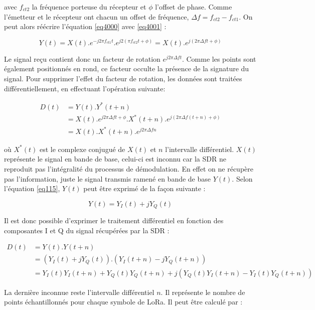 avec $f_{ct2}$ la fréquence porteuse du récepteur et $\phi$ l'offset de phase. Comme l'émetteur et le récepteur ont chacun un offset de fréquence, $\Delta f = f_{ct2} - f_{ct1}$. On peut alors réécrire l'équation \ref{eq4000} avec \ref{eq4001} :

\begin{equation}\label{eq4002}
	Y(t) = X(t) . e^{-j2\pi f_{ct1} t} . e^{j2(\pi f_{ct2} t+ \phi)} = X(t) . e^{j(2\pi \Delta f t + \phi)}
\end{equation} 

Le signal reçu contient donc un facteur de rotation $e^{j2\pi \Delta f t}$. Comme les points sont également positionnés en rond, ce facteur occulte la présence de la signature du signal.
Pour supprimer l'effet du facteur de rotation, les données sont traitées différentiellement, en effectuant l'opération suivante:

\begin{align}\label{eq4003}
	D(t) &= Y(t) . Y^{*}(t+n) \\
		 &= X(t) . e^{j2\pi \Delta f t+ \phi} .X^{*}(t+n) . e^{j(2\pi \Delta f (t + n) + \phi)} \\
 		 &= X(t) . X^{*}(t+n) . e^{j2\pi \Delta f n}
\end{align}

où $X^{*}(t)$ est le complexe conjugué de $X(t)$ et $n$ l'intervalle différentiel. $X(t)$ représente le signal en bande de base, celui-ci est inconnu car la SDR ne reproduit pas l'intégralité du processus de démodulation. En effet on ne récupère pas l'information, juste le signal transmis ramené en bande de base $Y(t)$. Selon l'équation \ref{eq115}, $Y(t)$ peut être exprimé de la façon suivante : 

\begin{equation}\label{eq4004}
	Y(t) = Y_I(t) + jY_Q(t)
\end{equation} 

Il est donc possible d'exprimer le traitement différentiel en fonction des composantes I et Q du signal récupérées par la SDR :

\begin{align}\label{eq4005}
	D(t) &= Y(t) . Y(t+n) \\
		 &= (Y_I(t) + jY_Q(t)) . (Y_I(t+n) - jY_Q(t+n)) \\
 		 &= Y_I(t)Y_I(t+n) + Y_Q(t)Y_Q(t+n) + j(Y_Q(t)Y_I(t+n) - Y_I(t)Y_Q(t+n))
\end{align}

La dernière inconnue reste l'intervalle différentiel $n$. Il représente le nombre de points échantillonnés pour chaque symbole de LoRa. Il peut être calculé par :

